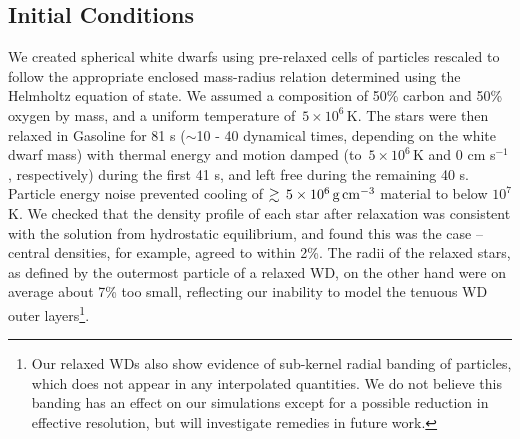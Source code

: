 
\subsection{Initial Conditions}
\label{ssec:c2_initcond}

We created spherical white dwarfs using pre-relaxed cells of particles rescaled to follow the appropriate enclosed mass-radius relation determined using the Helmholtz equation of state.  We assumed a composition of 50\% carbon and 50\% oxygen by mass, and a uniform temperature of~$5\times10^6\,$K.  The stars were then relaxed in Gasoline for 81 s ($\sim$10 - 40 dynamical times, depending on the white dwarf mass) with thermal energy and motion damped (to~$5\times10^6\,$K and 0 cm s$^{-1}$, respectively) during the first 41 s, and left free during the remaining 40 s.  Particle energy noise prevented cooling of $\gtrsim\,5\times10^6\,\gcc$ material to below $10^7$ K.  We checked that the density profile of each star after relaxation was consistent with the solution from hydrostatic equilibrium, and found this was the case -- central densities, for example, agreed to within 2\%.  The radii of the relaxed stars, as defined by the outermost particle of a relaxed WD, on the other hand were on average about 7\% too small, reflecting our inability to model the tenuous WD outer layers\footnote{Our relaxed WDs also show evidence of sub-kernel radial banding of particles, which does not appear in any interpolated quantities.  We do not believe this banding has an effect on our simulations except for a possible reduction in effective resolution, but will investigate remedies in future work.}.

